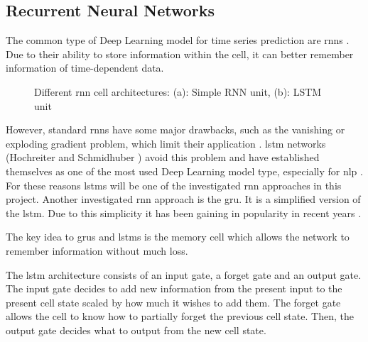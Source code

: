 \documentclass[conference]{IEEEtran}
\begin{document}
\subsection{Recurrent Neural Networks}
\label{sec:recurrent_neural_networks}

The common type of Deep Learning model for time series prediction are \glspl{rnn} \cite{Bai2018}. Due to their ability to store information within the cell, it can better remember information of time-dependent data. 

\begin{figure}[htp]
	\centering
	\quad
	\caption{Different \gls{rnn} cell architectures: (a): Simple RNN unit, (b): LSTM unit \cite{Chen2021}}
	\label{fig:RNN-classification}
\end{figure}

However, standard \glspl{rnn} have some major drawbacks, such as the vanishing or exploding gradient problem, which limit their application \cite{Bengio1994}. \gls{lstm} networks (Hochreiter and Schmidhuber \cite{Hochreiter1997}) avoid this problem and have established themselves as one of the most used Deep Learning model type, especially for \gls{nlp} \cite{Wu2016}. For these reasons \glspl{lstm} will be one of the investigated \gls{rnn} approaches in this project. Another investigated \gls{rnn} approach is the \gls{gru}. It is a simplified version of the \gls{lstm}. Due to this simplicity it has been gaining in popularity in recent years \cite{Rana2016}. 

The key idea to \glspl{gru} and \glspl{lstm} is the memory cell which allows the network to remember information without much loss.

The \gls{lstm} architecture consists of an input gate, a forget gate and an output gate. The input gate decides to add new information from the present input to the present cell state scaled by how much it wishes to add them. The forget gate allows the cell to know how to partially forget the previous cell state. Then, the output gate decides what to output from the new cell state.
\end{document}
